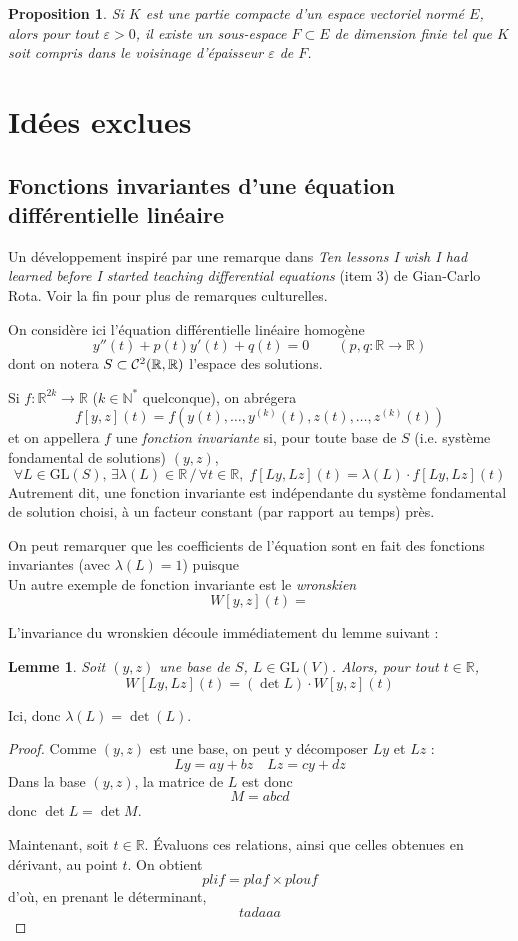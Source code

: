 \documentclass[a4paper, 11pt]{article}
\def\N{\mathbb{N}}
\def\R{\mathbb{R}}
\def\Cf{{\cal{C}}}
\def\GL{\mathrm{GL}}
\newtheorem*{proposition}{Proposition}
\newtheorem*{lemma}{Lemme}
\begin{document}
\begin{proposition}
  Si $K$ est une partie compacte d'un espace vectoriel normé $E$, alors pour
  tout $\varepsilon > 0$, il existe un sous-espace $F \subset E$ de dimension
  finie tel que $K$ soit compris dans le voisinage d'épaisseur $\varepsilon$ de
  $F$.
\end{proposition}

\newpage


\section{Idées exclues}

\subsection{Fonctions invariantes d'une équation différentielle linéaire}

Un développement inspiré par une remarque dans \emph{Ten lessons I wish I had
  learned before I started teaching differential equations} (item 3) de
Gian-Carlo Rota. Voir la fin pour plus de remarques culturelles. 

On considère ici l'équation différentielle linéaire
homogène
\[ y''(t) + p(t)y'(t) + q(t) = 0 \qquad (p, q : \R \to \R) \]
dont on notera $S \subset \Cf^2(\R, \R)$ l'espace des solutions.

Si $f : \R^{2k} \to \R$ ($k \in \N^*$ quelconque), on abrégera
\[ f[y,z](t) = f \left(y(t), \ldots, y^{(k)}(t), z(t), \ldots,
    z^{(k)}(t)\right) \]
et on appellera $f$ une \emph{fonction invariante} si, pour toute
base de $S$ (i.e. système fondamental de solutions) $(y, z)$,
\[
  \forall L \in \GL(S),\, \exists \lambda(L) \in \R \,/\, \forall t \in \R,\;
  f[Ly,Lz](t) = \lambda(L) \cdot f[Ly, Lz](t)
\]
Autrement dit, une fonction invariante est indépendante du système fondamental
de solution choisi, à un facteur constant (par rapport au temps) près.

On peut remarquer que les coefficients de l'équation sont en fait des fonctions
invariantes (avec $\lambda(L) = 1$) puisque
\[ \]
Un autre exemple de fonction invariante est le \emph{wronskien}
\[  W[y,z](t) =  \]

L'invariance du wronskien découle immédiatement du lemme suivant :
\begin{lemma}
  Soit $(y, z)$ une base de $S$, $L \in \GL(V)$. Alors, pour tout $t \in \R$,
  \[ W[Ly,Lz](t) = (\det L) \cdot W[y,z](t) \]
\end{lemma}
Ici, donc $\lambda(L) = \det(L)$.
\begin{proof}
  Comme $(y,z)$ est une base, on peut y décomposer $Ly$ et $Lz$ :
  \[ Ly = ay + bz \quad Lz = cy + dz \]
  Dans la base $(y,z)$, la matrice de $L$ est donc
  \[ M = abcd \]
  donc $\det L = \det M$.

  Maintenant, soit $t \in \R$. Évaluons ces relations, ainsi que celles obtenues
  en dérivant, au point $t$. On obtient
  \[ plif = plaf \times plouf \]
  d'où, en prenant le déterminant,
  \[ tadaaa \]
\end{proof}
\end{document}
